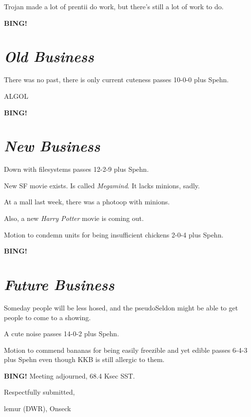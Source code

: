 \documentclass[10pt]{article}
\newcommand{\bing}{{\bf BING!} }
\newcommand{\goto}[1]{\bing \vskip 12pt \section*{{\em{#1}}}}
\newcommand{\ps}{ plus Spehn\xspace}
\newcommand{\onseck}{lemur (DWR), Onseck}
\begin{document}
Trojan made a lot of prentii do work, but there's still a lot of work to do.

\goto{Old Business}

There was no past, there is only current cuteness passes 10-0-0\ps.

ALGOL

\goto{New Business}

Down with filesystems passes 12-2-9\ps.

New SF movie exists.  Is called \emph{Megamind}.  It lacks minions, sadly.

At a mall last week, there was a photoop with minions.

Also, a new \emph{Harry Potter} movie is coming out.

Motion to condemn units for being insufficient chickens 2-0-4\ps.

\goto{Future Business}

Someday people will be less hosed, and the pseudoSeldon might be able
to get people to come to a showing.

A cute noise passes 14-0-2\ps.

Motion to commend bananas for being easily freezible and yet edible passes
6-4-3\ps even though KKB is still allergic to them.

\bing
\noindent
Meeting adjourned, 68.4 Ksec SST.

\vspace{18pt}

\centerline{Respectfully submitted,}
\centerline{\onseck}
\end{document}
